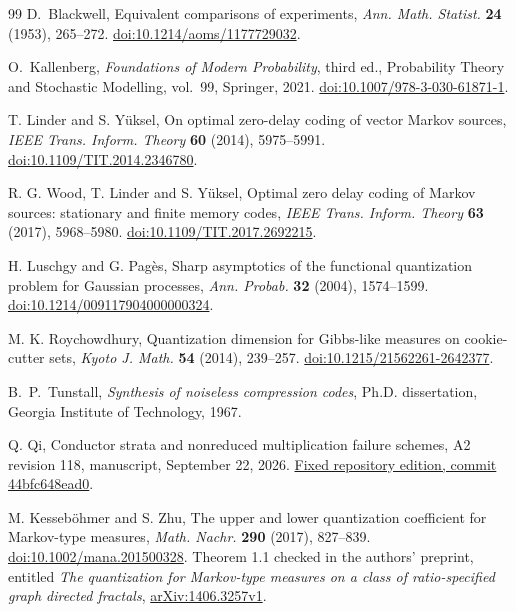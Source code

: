 \begin{thebibliography}{99}
D.~Blackwell, Equivalent comparisons of experiments,
\emph{Ann. Math. Statist.} \textbf{24} (1953), 265--272.
\href{https://doi.org/10.1214/aoms/1177729032}{doi:10.1214/aoms/1177729032}.

O.~Kallenberg, \emph{Foundations of Modern Probability}, third ed.,
Probability Theory and Stochastic Modelling, vol.~99, Springer, 2021.
\href{https://doi.org/10.1007/978-3-030-61871-1}{doi:10.1007/978-3-030-61871-1}.

T. Linder and S. Y\"uksel, On optimal zero-delay coding of vector
Markov sources, \emph{IEEE Trans. Inform. Theory} \textbf{60}
(2014), 5975--5991.
\href{https://doi.org/10.1109/TIT.2014.2346780}{doi:10.1109/TIT.2014.2346780}.

R. G. Wood, T. Linder and S. Y\"uksel, Optimal zero delay coding of
Markov sources: stationary and finite memory codes,
\emph{IEEE Trans. Inform. Theory} \textbf{63} (2017), 5968--5980.
\href{https://doi.org/10.1109/TIT.2017.2692215}{doi:10.1109/TIT.2017.2692215}.

H. Luschgy and G. Pag\`es, Sharp asymptotics of the functional
quantization problem for Gaussian processes,
\emph{Ann. Probab.} \textbf{32} (2004), 1574--1599.
\href{https://doi.org/10.1214/009117904000000324}{doi:10.1214/009117904000000324}.

M. K. Roychowdhury, Quantization dimension for Gibbs-like measures
on cookie-cutter sets, \emph{Kyoto J. Math.} \textbf{54} (2014),
239--257.
\href{https://doi.org/10.1215/21562261-2642377}{doi:10.1215/21562261-2642377}.

B.~P.~Tunstall, \emph{Synthesis of noiseless compression codes},
Ph.D. dissertation, Georgia Institute of Technology, 1967.

Q. Qi, Conductor strata and nonreduced multiplication failure schemes,
A2 revision 118, manuscript, September 22, 2026.
\href{https://github.com/TrillionniumFoundation/theta-theory/tree/44bfc648ead008896a6981a7302a6d5ab8b21bb8/papers/A2-v17-boundary-information-coarsening/article/v118}{Fixed repository edition, commit 44bfc648ead0}.

M. Kesseb\"ohmer and S. Zhu, The upper and lower quantization coefficient
for Markov-type measures, \emph{Math. Nachr.} \textbf{290} (2017), 827--839.
\href{https://doi.org/10.1002/mana.201500328}{doi:10.1002/mana.201500328}.
Theorem 1.1 checked in the authors' preprint, entitled
\emph{The quantization for Markov-type measures on a class of
ratio-specified graph directed fractals},
\href{https://arxiv.org/abs/1406.3257v1}{arXiv:1406.3257v1}.


\end{thebibliography}
